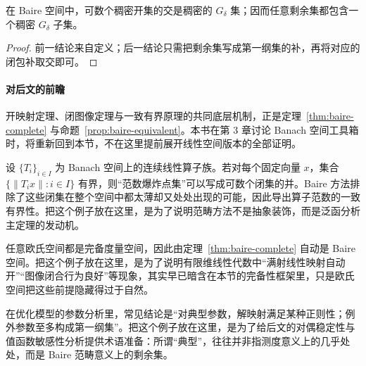 \begin{corollary}\label{cor:dense-gdelta}
在 Baire 空间中，可数个稠密开集的交是稠密的 $G_\delta$ 集；因而任意剩余集都包含一个稠密 $G_\delta$ 子集。
\end{corollary}

\begin{proof}
前一结论来自定义；后一结论只需把剩余集写成第一纲集的补，再将对应的闭包补取交即可。
\end{proof}

\paragraph{对后文的前瞻}

\begin{remark}
开映射定理、闭图像定理与一致有界原理的共同底层机制，正是定理~\ref{thm:baire-complete} 与命题~\ref{prop:baire-equivalent}。本书在第 3 章讨论 Banach 空间工具箱时，将重新回到本节，不在这里提前展开线性空间版本的全部证明。
\end{remark}

\begin{example}\label{ex:uniform-boundedness-shadow}
设 $\{T_i\}_{i\in I}$ 为 Banach 空间上的连续线性算子族。若对每个固定向量 $x$，集合 $\{\|T_i x\|:i\in I\}$ 有界，则“范数爆炸点集”可以写成可数个闭集的并。Baire 方法排除了这些闭集在整个空间中都太薄却又处处出现的可能，因此导出算子范数的一致有界性。把这个例子放在这里，是为了说明范畴方法不是抽象装饰，而是泛函分析主定理的发动机。
\end{example}

\begin{example}\label{ex:finite-dimensional-baire}
任意欧氏空间都是完备度量空间，因此由定理~\ref{thm:baire-complete} 自动是 Baire 空间。把这个例子放在这里，是为了说明有限维线性代数中“满射线性映射自动开”“图像闭合行为良好”等现象，其实早已暗含在本节的完备性框架里，只是欧氏空间把这些前提隐藏得过于自然。
\end{example}

\begin{example}\label{ex:thin-bad-parameters}
在优化模型的参数分析里，常见结论是“对典型参数，解映射满足某种正则性；例外参数至多构成第一纲集”。把这个例子放在这里，是为了给后文的对偶稳定性与值函数敏感性分析提供术语准备：所谓“典型”，往往并非指测度意义上的几乎处处，而是 Baire 范畴意义上的剩余集。
\end{example}

